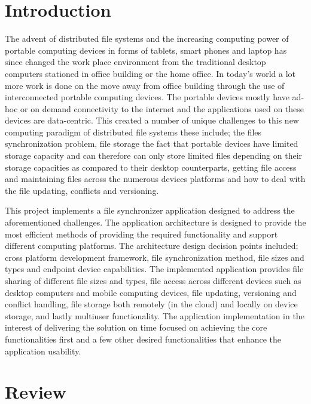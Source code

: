 \documentclass[11pt]{article}
\begin{document}
\section{Introduction}

The advent of distributed file systems and the increasing computing power of portable computing devices in forms of tablets, smart phones and laptop has since changed the work place environment from the traditional desktop computers stationed in office building or the home office. In today’s world a lot more work is done on the move away from office building through the use of interconnected portable computing devices. The portable devices mostly have ad-hoc or on demand connectivity to the internet and the applications used on these devices are data-centric. This created a number of unique challenges to this new computing paradigm of distributed file systems these include; the files synchronization problem, file storage the fact that portable devices have limited storage capacity and can therefore can only store limited files depending on their storage capacities as compared to their desktop counterparts, getting file access and maintaining files across the numerous devices platforms and how to deal with the file updating, conflicts and versioning.

This project implements a file synchronizer application designed to address the aforementioned challenges. The application architecture is designed to provide the most efficient methods of providing the required functionality and support different computing platforms. The architecture design decision points included; cross platform development framework, file synchronization method, file sizes and types and endpoint device capabilities. The implemented application provides file sharing of different file sizes and types, file access across different devices such as desktop computers and mobile computing devices, file updating, versioning and conflict handling, file storage both remotely (in the cloud) and locally on device storage, and lastly multiuser functionality. The application implementation in the interest of delivering the solution on time focused on achieving the core functionalities first and a few other desired functionalities that enhance the application usability.


\section{Review}
\end{document}
